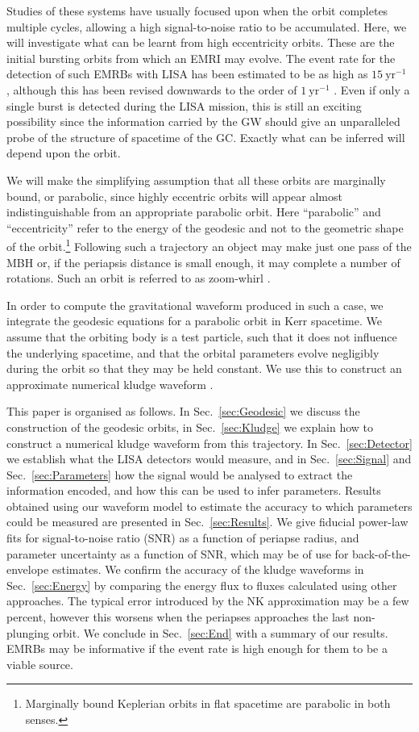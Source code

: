 \documentclass[useAMS,usedcolumn,usegraphicx,usenatbib]{mn2e}
\newcommand{\secref}[1]{Sec.~\ref{sec:#1}}
\newcommand{\units}[1]{\ensuremath{~\mathrm{#1}}}
\begin{document}
Studies of these systems have usually focused upon when the orbit completes multiple cycles, allowing a high signal-to-noise ratio to be accumulated. Here, we will investigate what can be learnt from high eccentricity orbits. These are the initial bursting orbits from which an EMRI may evolve. The event rate for the detection of such EMRBs with LISA has been estimated to be as high as $15\units{yr^{-1}}$ \citep*{Rubbo2006}, although this has been revised downwards to the order of $1\units{yr^{-1}}$ \citep*{Hopman2007}. Even if only a single burst is detected during the LISA mission, this is still an exciting possibility since the information carried by the GW should give an unparalleled probe of the structure of spacetime of the GC. Exactly what can be inferred will depend upon the orbit.

We will make the simplifying assumption that all these orbits are marginally bound, or parabolic, since highly eccentric orbits will appear almost indistinguishable from an appropriate parabolic orbit. Here ``parabolic'' and ``eccentricity'' refer to the energy of the geodesic and not to the geometric shape of the orbit.\footnote{Marginally bound Keplerian orbits in flat spacetime are parabolic in both senses.} Following such a trajectory an object may make just one pass of the MBH or, if the periapsis distance is small enough, it may complete a number of rotations. Such an orbit is referred to as zoom-whirl \citep{Glampedakis2002a}.

In order to compute the gravitational waveform produced in such a case, we integrate the geodesic equations for a parabolic orbit in Kerr spacetime. We assume that the orbiting body is a test particle, such that it does not influence the underlying spacetime, and that the orbital parameters evolve negligibly during the orbit so that they may be held constant. We use this to construct an approximate numerical kludge waveform \citep{Babak2007}.

This paper is organised as follows. In \secref{Geodesic} we discuss the construction of the geodesic orbits, in \secref{Kludge} we explain how to construct a numerical kludge waveform from this trajectory. In \secref{Detector} we establish what the LISA detectors would measure, and in \secref{Signal} and \secref{Parameters} how the signal would be analysed to extract the information encoded, and how this can be used to infer parameters. Results obtained using our waveform model to estimate the accuracy to which parameters could be measured are presented in \secref{Results}. We give fiducial power-law fits for signal-to-noise ratio (SNR) as a function of periapse radius, and parameter uncertainty as a function of SNR, which may be of use for back-of-the-envelope estimates. We confirm the accuracy of the kludge waveforms in \secref{Energy} by comparing the energy flux to fluxes calculated using other approaches. The typical error introduced by the NK approximation may be a few percent, however this worsens when the periapses approaches the last non-plunging orbit. We conclude in \secref{End} with a summary of our results. EMRBs may be informative if the event rate is high enough for them to be a viable source.
\end{document}
